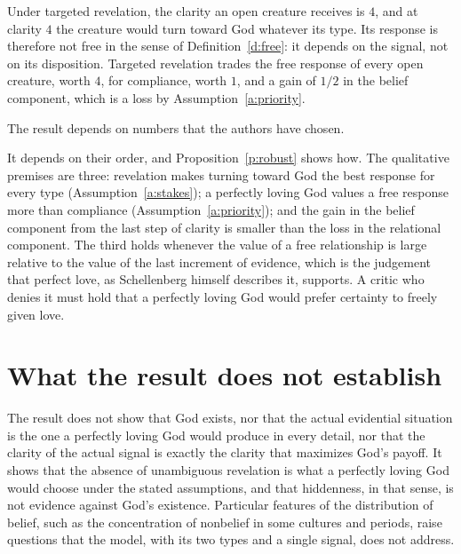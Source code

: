 \documentclass{situationist-preprint}
\begin{document}
\begin{reply}
Under targeted revelation, the clarity an open creature receives is $4$, and at clarity $4$ the creature would turn toward God whatever its type. Its response is therefore not free in the sense of Definition~\ref{d:free}: it depends on the signal, not on its disposition. Targeted revelation trades the free response of every open creature, worth $4$, for compliance, worth $1$, and a gain of $1/2$ in the belief component, which is a loss by Assumption~\ref{a:priority}.
\end{reply}

\begin{objection}
The result depends on numbers that the authors have chosen.
\end{objection}

\begin{reply}
It depends on their order, and Proposition~\ref{p:robust} shows how. The qualitative premises are three: revelation makes turning toward God the best response for every type (Assumption~\ref{a:stakes}); a perfectly loving God values a free response more than compliance (Assumption~\ref{a:priority}); and the gain in the belief component from the last step of clarity is smaller than the loss in the relational component. The third holds whenever the value of a free relationship is large relative to the value of the last increment of evidence, which is the judgement that perfect love, as Schellenberg himself describes it, supports. A critic who denies it must hold that a perfectly loving God would prefer certainty to freely given love.
\end{reply}

\section{What the result does not establish}

The result does not show that God exists, nor that the actual evidential situation is the one a perfectly loving God would produce in every detail, nor that the clarity of the actual signal is exactly the clarity that maximizes God's payoff. It shows that the absence of unambiguous revelation is what a perfectly loving God would choose under the stated assumptions, and that hiddenness, in that sense, is not evidence against God's existence. Particular features of the distribution of belief, such as the concentration of nonbelief in some cultures and periods, raise questions that the model, with its two types and a single signal, does not address.
\end{document}
